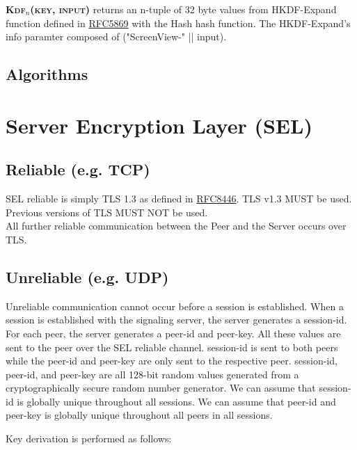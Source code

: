 \documentclass{article}
\begin{document}
    \textbf{\textsc{Kdf$_n$(key, input)}} returns an n-tuple of 32 byte values from HKDF-Expand function defined in \href{https://datatracker.ietf.org/doc/html/rfc5869}{RFC5869}
    with the Hash hash function. The HKDF-Expand's info paramter composed of ("ScreenView-" || input). \\

    \subsection{Algorithms}



    \section{Server Encryption Layer (SEL)}

    \subsection{Reliable (e.g. TCP)}

    SEL reliable is simply TLS 1.3 as defined in
    \href{https://datatracker.ietf.org/doc/html/rfc8446}{RFC8446}.
    TLS v1.3 MUST be used.
    Previous versions of TLS MUST NOT be used.\\


    All further reliable communication between the Peer and the Server occurs over TLS.

    \subsection{Unreliable (e.g. UDP)}

    Unreliable communication cannot occur before a session is established.
    When a session is established with the signaling server, the server generates a session-id.
    For each peer, the server generates a peer-id and peer-key.
    All these values are sent to the peer over the SEL reliable channel.
    session-id is sent to both peers while the peer-id and peer-key are only sent to the respective peer.
    session-id, peer-id, and peer-key are all 128-bit random values generated from a cryptographically secure random number generator.
    We can assume that session-id is globally unique throughout all sessions.
    We can assume that peer-id and peer-key is globally unique throughout all peers in all sessions.

    Key derivation is performed as follows:
\end{document}
